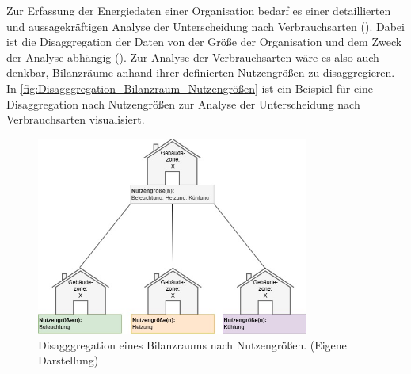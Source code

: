 Zur Erfassung der Energiedaten einer Organisation bedarf es einer detaillierten und aussagekräftigen Analyse der Unterscheidung nach Verbrauchsarten 
(\cite[S. 14]{Hohnhold.2013}). Dabei ist die Disaggregation der Daten von der Größe der Organisation und dem Zweck der Analyse abhängig (\cite[S. 14f.]{Hohnhold.2013}).
Zur Analyse der Verbrauchsarten wäre es also auch denkbar, Bilanzräume anhand ihrer definierten Nutzengrößen zu disaggregieren.
In \eqref{fig:Disagggregation_Bilanzraum_Nutzengrößen} ist ein Beispiel für eine Disaggregation nach Nutzengrößen 
zur Analyse der Unterscheidung nach Verbrauchsarten visualisiert.




\begin{figure}[H]
    \centering
    \includegraphics[width=0.8\textwidth]{../../Ressourcen/Abbildungen/Nutzengröße_Bewertungseinheit_Zerlegt.jpg}
    \caption{Disagggregation eines Bilanzraums nach Nutzengrößen. (Eigene Darstellung)}
    \label{fig:Disagggregation_Bilanzraum_Nutzengrößen}
\end{figure}